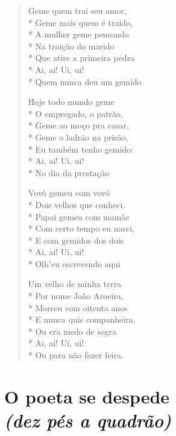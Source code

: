 \begin{verse}
Geme quem trai seu amor,\\*
Geme mais quem é traído,\\*
A mulher geme pensando\\*
Na traição do marido\\*
Que atire a primeira pedra\\*
Ai, ai! Ui, ui!\\*
Quem nunca deu um gemido

Hoje todo mundo geme\\*
O empregado, o patrão,\\*
Geme ao moço pra casar,\\*
Geme o ladrão na prisão,\\*
Eu também tenho gemido:\\*
Ai, ai! Ui, ui!\\*
No dia da prestação

Vovô gemeu com vovó\\*
Dois velhos que conheci.\\*
Papai gemeu com mamãe\\*
Com certo tempo eu nasci,\\*
E com gemidos dos dois\\*
Ai, ai! Ui, ui!\\*
Olh'eu escrevendo aqui

Um velho de minha terra\\*
Por nome João Aroeira,\\*
Morreu com oitenta anos\\*
E nunca quis companheira,\\*
Ou era medo de sogra\\*
Ai, ai! Ui, ui!\\*
Ou para não fazer feira.
\end{verse}


\chapter[O poeta se despede]{O poeta se despede\\\smallskip\textit{(dez pés a quadrão)}}

